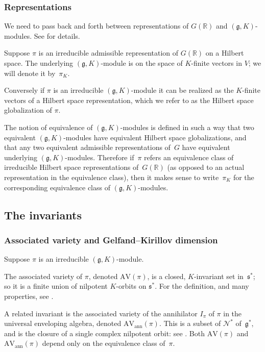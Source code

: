 \documentclass[10pt,leqno]{article}
\numberwithin{equation}{section}
\newcommand{\R}{\mathbb R}
\newcommand{\N}{\mathcal N}
\newcommand{\g}{\mathfrak g}
\newcommand{\s}{\mathfrak s}
\newcommand{\AV}{\mathrm{AV}}
\newcommand{\AVann}{\mathrm{AV}_{\mathrm{ann}}}
\begin{document}
\subsubsection*{Representations} 
We need to pass back and forth between representations of $G(\R)$ and $(\g,K)$-modules.
See \cite{greenbook} for details.

Suppose $\pi$ is an irreducible admissible representation of $G(\R)$  on a Hilbert space. 
The underlying
$(\g,K)$-module is on the space of $K$-finite vectors in
$V$; we will denote it by~$\pi_K$. 

Conversely if $\pi$ is an irreducible $(\g,K)$-module it can be
realized as the $K$-finite vectors of a Hilbert space representation, which we
refer to as the Hilbert space globalization of $\pi$.

The notion of equivalence of $(\g, K)$-modules is defined in such a way that two equivalent $(\g, K)$-modules have equivalent Hilbert space globalizations, and that any two equivalent admissible representations of~$G$ have equivalent underlying $(\g, K)$-modules. Therefore if~$\pi$ refers an equivalence class of irreducible Hilbert space representations of~$G(\R)$ (as opposed to an actual representation in the equivalence class), then it makes sense to write~$\pi_K$ for the corresponding equivalence class of $(\g, K)$-modules.

\subsection{The invariants}\label{sec:invariants}


\subsubsection*{Associated variety and Gelfand--Kirillov dimension}


Suppose $\pi$ is an irreducible $(\g,K)$-module.

The associated variety of $\pi$, denoted $\AV(\pi)$, is a closed, $K$-invariant set in~$\s^*$; so it is a finite union of
nilpotent $K$-orbits on $\s^*$. For the definition, and many properties, see \cite[Section 5]{vogan_bowdoin}. 


A related invariant is the associated variety of the annihilator $I_\pi$ of $\pi$ in the universal enveloping algebra, 
denoted $\AVann(\pi)$.
This is a subset of $\N^*$ of~$\g^*$, and is the closure of a single complex nilpotent orbit: see \cite[Section 1, Theorem~4.7]{vogan_bowdoin}. Both $\AV(\pi)$ and $\AVann(\pi)$ depend only on the equivalence class of~$\pi$.
\end{document}
